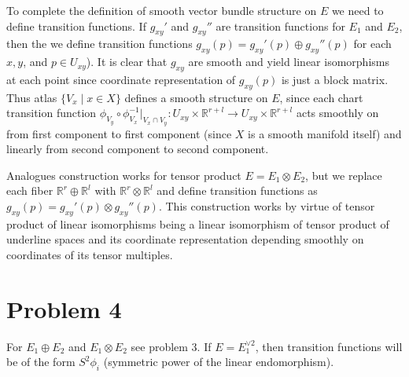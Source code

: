 \documentclass{article}[14pt]
\begin{document}
To complete the definition of smooth vector bundle structure on $E$ we need to define
transition functions. If $g_{xy}'$ and $g_{xy}''$ are transition functions for $E_1$ and $E_2$, then the we define transition functions $g_{xy}(p) = g_{xy}' (p) \oplus g_{xy}'' (p)$ for each $x, y$, and $p \in U_{xy}$).
It is clear that $g_{xy}$ are smooth and yield linear
isomorphisms at each point since coordinate representation of $g_{xy}(p)$ is just a block matrix.
Thus atlas $\{ V_x \mid x \in X \}$ defines a smooth structure on $E$,
since each chart transition function $\phi_{V_y} \circ \phi_{V_x}^{-1} |_{V_x \cap V_y}: U_{xy} \times \mathbb R^{r+l} \rightarrow U_{xy} \times \mathbb R^{r+l}$ 
acts smoothly on from first component to first component (since $X$ is a smooth manifold itself)
and linearly from second component to second component.

Analogues construction works for tensor product $E = E_1 \otimes E_2$,
but we replace each fiber $\mathbb R^r \oplus \mathbb R^l$ with $\mathbb R^r \otimes \mathbb R^l$
and define transition functions as $g_{xy}(p) = g_{xy}'(p) \otimes g_{xy}'' (p)$. 
This construction works by virtue of tensor product of linear isomorphisms being a linear isomorphism of tensor product of underline spaces
and its coordinate representation depending smoothly
on coordinates of its tensor multiples.

\section{Problem 4}

For $E_1 \oplus E_2$ and $E_1 \otimes E_2$ see problem 3. If $E = E_1^{\lor 2}$, then transition functions will be of the form $S^2 \phi_i$ (symmetric power of the linear endomorphism).
\end{document}
